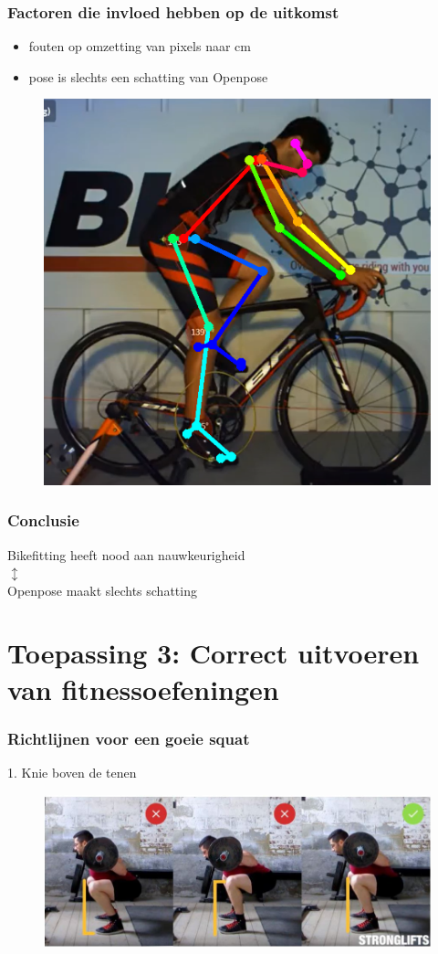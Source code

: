 \documentclass
   [kulak] %
   {kulakbeamer}
\begin{document}
\begin{frame}
	\frametitle{Factoren die invloed hebben op de uitkomst}
	\begin{itemize}
		\item fouten op omzetting van pixels naar \si{cm}
		\item pose is slechts een schatting van Openpose
	\end{itemize}
	\begin{figure}
	\includegraphics[width= .55\textwidth]{prof_bikefit}
	\end{figure}
\end{frame}

\begin{frame}
\frametitle{Conclusie}

\begin{center}
	Bikefitting heeft nood aan nauwkeurigheid\\
	$\updownarrow$ \\
	Openpose maakt slechts schatting
\end{center}


\end{frame}

\section{Toepassing 3: Correct uitvoeren van fitnessoefeningen}

\begin{frame}
	\frametitle{Richtlijnen voor een goeie squat}
	1. Knie boven de tenen
	\begin{figure}
		\includegraphics[width= \textwidth]{squat_knie}
	\end{figure}
\end{frame}
\end{document}
